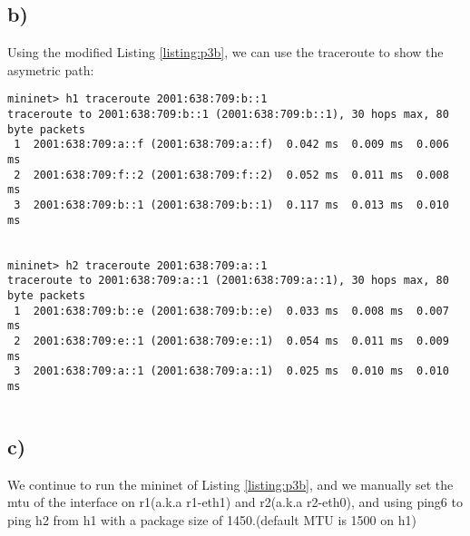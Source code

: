\documentclass{article}
\begin{document}
\label{listing:p3a}
\inputminted[linenos=true, frame=lines]{python}{src/p3.a.py}

\subsection*{b)}
Using the modified Listing \ref{listing:p3b}, we can use the traceroute to show
the asymetric path:
\begin{verbatim}
mininet> h1 traceroute 2001:638:709:b::1
traceroute to 2001:638:709:b::1 (2001:638:709:b::1), 30 hops max, 80 byte packets
 1  2001:638:709:a::f (2001:638:709:a::f)  0.042 ms  0.009 ms  0.006 ms
 2  2001:638:709:f::2 (2001:638:709:f::2)  0.052 ms  0.011 ms  0.008 ms
 3  2001:638:709:b::1 (2001:638:709:b::1)  0.117 ms  0.013 ms  0.010 ms


mininet> h2 traceroute 2001:638:709:a::1
traceroute to 2001:638:709:a::1 (2001:638:709:a::1), 30 hops max, 80 byte packets
 1  2001:638:709:b::e (2001:638:709:b::e)  0.033 ms  0.008 ms  0.007 ms
 2  2001:638:709:e::1 (2001:638:709:e::1)  0.054 ms  0.011 ms  0.009 ms
 3  2001:638:709:a::1 (2001:638:709:a::1)  0.025 ms  0.010 ms  0.010 ms
\end{verbatim}
\label{listing:p3b}
\inputminted[linenos=true, frame=lines]{python}{src/p3.b.py}

\subsection*{c)}
We continue to run the mininet of Listing \ref{listing:p3b}, and we manually set
the mtu of the interface on r1(a.k.a r1-eth1) and r2(a.k.a r2-eth0), and using
ping6 to ping h2 from h1 with a package size of 1450.(default MTU is 1500 on h1)
\end{document}
